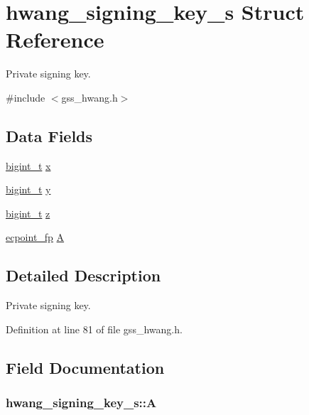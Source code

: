 \hypertarget{structhwang__signing__key__s}{\section{hwang\-\_\-signing\-\_\-key\-\_\-s Struct Reference}
\label{structhwang__signing__key__s}
}


Private signing key.  




{\ttfamily \#include $<$gss\-\_\-hwang.\-h$>$}

\subsection*{Data Fields}
\begin{DoxyCompactItemize}
\item 
\hyperlink{types_8h_a7ae8816fa287bc4a98dec462acd2ad28}{bigint\-\_\-t} \hyperlink{structhwang__signing__key__s_a4bc042988eb9502f13b5d9a39d464162}{x}
\item 
\hyperlink{types_8h_a7ae8816fa287bc4a98dec462acd2ad28}{bigint\-\_\-t} \hyperlink{structhwang__signing__key__s_a4e4cf40f89a8ae9719f7af364568758c}{y}
\item 
\hyperlink{types_8h_a7ae8816fa287bc4a98dec462acd2ad28}{bigint\-\_\-t} \hyperlink{structhwang__signing__key__s_a449002dc7e21a8911b688d7c0f9a3ab7}{z}
\item 
\hyperlink{structecpoint__fp}{ecpoint\-\_\-fp} \hyperlink{structhwang__signing__key__s_a7e20b38ec61d082b1933fc2eba21a5e6}{A}
\end{DoxyCompactItemize}


\subsection{Detailed Description}
Private signing key. 



Definition at line 81 of file gss\-\_\-hwang.\-h.



\subsection{Field Documentation}
\hypertarget{structhwang__signing__key__s_a7e20b38ec61d082b1933fc2eba21a5e6}{
\subsubsection[{A}]{ hwang\-\_\-signing\-\_\-key\-\_\-s\-::\-A}}\label{structhwang__signing__key__s_a7e20b38ec61d082b1933fc2eba21a5e6}


